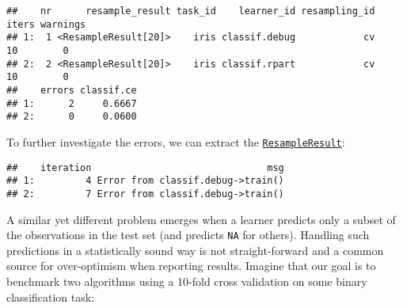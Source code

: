 \documentclass[
]{scrbook}
\newenvironment{Shaded}{\begin{snugshade}}{\end{snugshade}}
\newcommand{\AttributeTok}[1]{\textcolor[rgb]{0.77,0.63,0.00}{#1}}
\newcommand{\ConstantTok}[1]{\textcolor[rgb]{0.00,0.00,0.00}{#1}}
\newcommand{\FloatTok}[1]{\textcolor[rgb]{0.00,0.00,0.81}{#1}}
\newcommand{\FunctionTok}[1]{\textcolor[rgb]{0.00,0.00,0.00}{#1}}
\newcommand{\NormalTok}[1]{#1}
\newcommand{\OtherTok}[1]{\textcolor[rgb]{0.56,0.35,0.01}{#1}}
\newcommand{\SpecialCharTok}[1]{\textcolor[rgb]{0.00,0.00,0.00}{#1}}
\newcommand{\StringTok}[1]{\textcolor[rgb]{0.31,0.60,0.02}{#1}}
\renewenvironment{Shaded} {\begin{snugshade}\small} {\end{snugshade}}
\begin{document}
\begin{Shaded}
\end{Shaded}

\begin{verbatim}
##    nr      resample_result task_id    learner_id resampling_id iters warnings
## 1:  1 <ResampleResult[20]>    iris classif.debug            cv    10        0
## 2:  2 <ResampleResult[20]>    iris classif.rpart            cv    10        0
##    errors classif.ce
## 1:      2     0.6667
## 2:      0     0.0600
\end{verbatim}

To further investigate the errors, we can extract the \href{https://mlr3.mlr-org.com/reference/ResampleResult.html}{\texttt{ResampleResult}}:

\begin{Shaded}
\end{Shaded}

\begin{verbatim}
##    iteration                               msg
## 1:         4 Error from classif.debug->train()
## 2:         7 Error from classif.debug->train()
\end{verbatim}

A similar yet different problem emerges when a learner predicts only a subset of the observations in the test set (and predicts \texttt{NA} for others).
Handling such predictions in a statistically sound way is not straight-forward and a common source for over-optimism when reporting results.
Imagine that our goal is to benchmark two algorithms using a 10-fold cross validation on some binary classification task:
\end{document}
